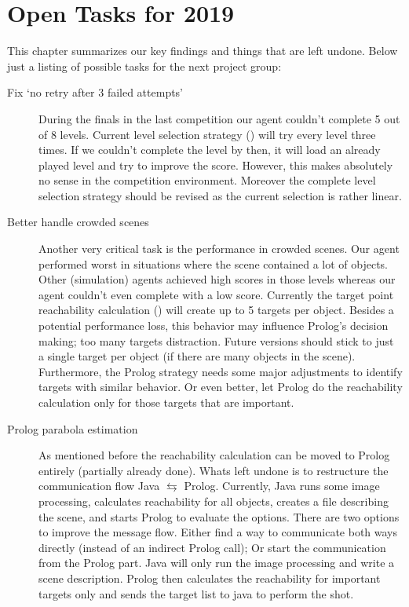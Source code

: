 \section{Open Tasks for 2019}\label{ch:todo}


This chapter summarizes our key findings and things that are left undone. Below just a listing of possible tasks for the next project group:

\begin{description}
	\item[Fix `no retry after 3 failed attempts']
	During the finals in the last competition our agent couldn't complete \num{5} out of \num{8} levels. Current level selection strategy () will try every level three times. If we couldn't complete the level by then, it will load an already played level and try to improve the score. However, this makes absolutely no sense in the competition environment. Moreover the complete level selection strategy should be revised as the current selection is rather linear.
	
	\item[Better handle crowded scenes]
	Another very critical task is the performance in crowded scenes. Our agent performed worst in situations where the scene contained a lot of objects. Other (simulation) agents achieved high scores in those levels whereas our agent couldn't even complete with a low score. Currently the target point reachability calculation () will create up to \num{5} targets per object. Besides a potential performance loss, this behavior may influence Prolog's decision making; too many targets distraction. Future versions should stick to just a single target per object (if there are many objects in the scene). Furthermore, the Prolog strategy needs some major adjustments to identify targets with similar behavior. Or even better, let Prolog do the reachability calculation only for those targets that are important.
	
	\item[Prolog parabola estimation]
	As mentioned before the reachability calculation can be moved to Prolog entirely (partially already done). Whats left undone is to restructure the communication flow Java $\leftrightarrows$ Prolog. Currently, Java runs some image processing, calculates reachability for all objects, creates a  file describing the scene, and starts Prolog to evaluate the options. There are two options to improve the message flow. Either find a way to communicate both ways directly (instead of an indirect Prolog call); Or start the communication from the Prolog part. Java will only run the image processing and write a scene description. Prolog then calculates the reachability for important targets only and sends the target list to java to perform the shot.
	

\end{description}
